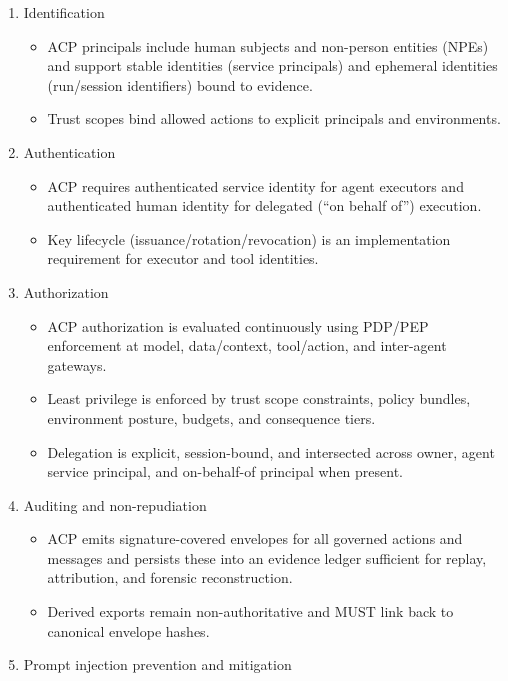 \documentclass[11pt]{article}
\begin{document}
\begin{enumerate}
\def\labelenumi{\arabic{enumi}.}
\tightlist
\item
  Identification

  \begin{itemize}
  \tightlist
  \item
    ACP principals include human subjects and non-person entities (NPEs)
    and support stable identities (service principals) and ephemeral
    identities (run/session identifiers) bound to evidence.
  \item
    Trust scopes bind allowed actions to explicit principals and
    environments.
  \end{itemize}
\item
  Authentication

  \begin{itemize}
  \tightlist
  \item
    ACP requires authenticated service identity for agent executors and
    authenticated human identity for delegated (``on behalf of'')
    execution.
  \item
    Key lifecycle (issuance/rotation/revocation) is an implementation
    requirement for executor and tool identities.
  \end{itemize}
\item
  Authorization

  \begin{itemize}
  \tightlist
  \item
    ACP authorization is evaluated continuously using PDP/PEP
    enforcement at model, data/context, tool/action, and inter-agent
    gateways.
  \item
    Least privilege is enforced by trust scope constraints, policy
    bundles, environment posture, budgets, and consequence tiers.
  \item
    Delegation is explicit, session-bound, and intersected across owner,
    agent service principal, and on-behalf-of principal when present.
  \end{itemize}
\item
  Auditing and non-repudiation

  \begin{itemize}
  \tightlist
  \item
    ACP emits signature-covered envelopes for all governed actions and
    messages and persists these into an evidence ledger sufficient for
    replay, attribution, and forensic reconstruction.
  \item
    Derived exports remain non-authoritative and MUST link back to
    canonical envelope hashes.
  \end{itemize}
\item
  Prompt injection prevention and mitigation


\end{enumerate}
\end{document}
